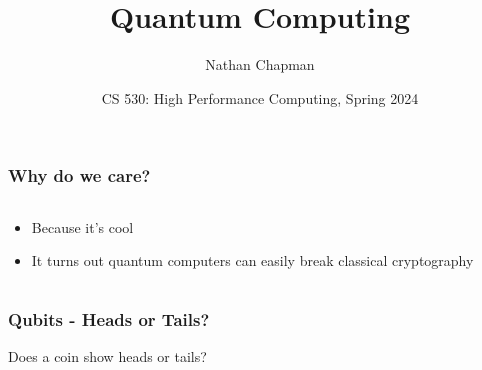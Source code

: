 \documentclass[aspectratio=169]{beamer}
\title[Quantum Computing]{Quantum Computing}
\author[Chapman, Nathan]{Nathan Chapman}
\institute[CWU]
{
  Central Washington University
}
\date[HPC 2024]{CS 530: High Performance Computing, Spring 2024}
\begin{document}
\frame{\titlepage}

\begin{frame}
    \frametitle{Why do we care?}
    \begin{columns}
        \begin{column}{0.5\textwidth}
            \begin{itemize}
                \item Because it's cool
                \item It turns out quantum computers can easily break classical cryptography
            \end{itemize}
        \end{column}
        \begin{column}{0.5\textwidth}
            
        \end{column}
    \end{columns}
\end{frame}

\begin{frame}
    \frametitle{Qubits - Heads or Tails?}

    \centering
    Does a coin show heads or tails?

\end{frame}
\end{document}
